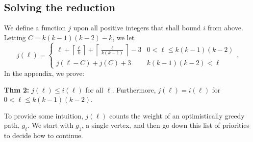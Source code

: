 \documentclass{article}
\DeclareMathOperator{\minto}{\bm{\mathsf{minto}}}
\newcommand{\hide}[1]{}
\newcommand{\edit}[1]{}%
\newcommand{\review}[1]{}%
\newcommand{\dc}[1]{}%
\begin{document}
\hide{
Bounding $R$ is a little more work. We note that for $p \in \mathcal{X}'$, and $u \not \in p$, that there is an exitless path $p_u$ containing $u$ and $p$, such that $w(p_u) = w(p) + (k-1)+w(u\to p[1])$, which implies that $w(p)+\minto(p) = \min_{u \in V(\mathcal{S}_k) \setminus V(p)}\{w(p_u)-(k-1)\}$. Specifically: 

\[p_u = \sigma^{-(k-1)}(u)\dots \sigma^{-1}(u), u, p[1],p[2]\dots p[|p|]\]
It is clear that $|p_u| = |p|+k$, and that $\{p_u:\}$ thus we exactly have that $R = \min_{\ell > k}\{(i(\ell)-(k-1)+1)/(\ell-k) \}$.\dc{ explain how you get this last equation.} \review{I added ``exactly'' to clarify that this is sharp, but I think it sounds kinda awkward}

We note since the paths of $X$ are strongly exitless, that we should include the restriction that $\ell$ is divisible by $k$ in our reductions. However, it will never be the case that an $\ell$ not divisible by $k$ will give a smaller value than $\ell+1$, thus the clarification is not really necessary. (the reason why is that taking a 1-edge always lowers your average weight, and thus should always be done, and we can always do so when $\ell$ is not divisible by $k$) \textbf{\edit{too dense; could be explained better}}}

\subsection{Solving the reduction} \label{solving reduction}

We define a function $j$ upon all positive integers that shall bound $i$ from above. Letting $C = k(k-1)(k-2)-k$, we let
\[j(\ell) = \begin{cases} 
\ell + \left\lceil \frac{\ell}{k}\right\rceil + \left\lceil \frac{\ell}{k(k-1)}\right\rceil -3 & 0 < \ell \leq k(k-1)(k-2)\\
j(\ell-C) + j(C)+3 & k(k-1)(k-2) < \ell
\end{cases} .\]In the appendix,\edit{ref} we prove:

\textbf{Thm 2:}\edit{amsthm} $j(\ell) \leq i(\ell)$ for all $\ell$. Furthermore, $j(\ell) = i(\ell)$ for $0 < \ell \leq k(k-1)(k-2)$.

To provide some intuition, $j(\ell)$ counts the weight of an optimistically greedy path, $g_\ell$. We start with $g_1$, a single vertex, and then go down this list of priorities to decide how to continue.
\end{document}
